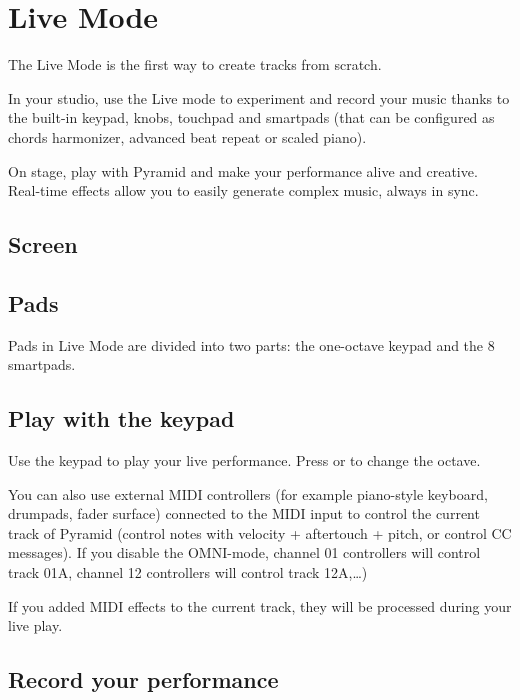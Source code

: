 \chapter{Live Mode}

The Live Mode is the first way to create tracks from scratch.

In your studio, use the Live mode to experiment and record your music thanks to the built-in keypad, knobs, touchpad and smartpads (that can be configured as chords harmonizer, advanced beat repeat or scaled piano).

On stage, play with Pyramid and make your performance alive and creative. Real-time effects allow you to easily generate complex music, always in sync.


\section{Screen}




\section{Pads}

Pads in Live Mode are divided into two parts: the one-octave keypad and the 8 smartpads.



\section{Play with the keypad}

Use the keypad \keypadicon{} to play your live performance. Press \btn{<} or \btn{>} to change the octave.

You can also use external MIDI controllers (for example piano-style keyboard, drumpads, fader surface) connected to the MIDI input to control the current track of Pyramid (control notes with velocity + aftertouch + pitch, or control CC messages). If you disable the OMNI-mode, channel 01 controllers will control track 01A, channel 12 controllers will control track 12A,\ldots )

If you added MIDI effects to the current track, they will be processed during your live play.


\section{Record your performance}

